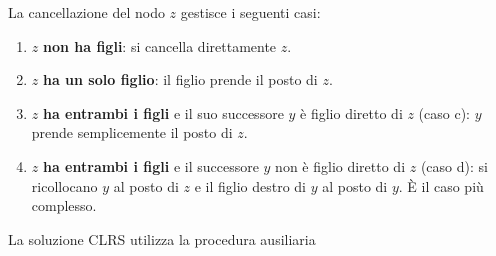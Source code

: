 La cancellazione del nodo $z$ gestisce i seguenti casi:
\begin{enumerate}
	\item $z$ \textbf{non ha figli}: si cancella direttamente $z$.
	\item $z$ \textbf{ha un solo figlio}: il figlio prende il posto di $z$.
	\item $z$ \textbf{ha entrambi i figli} e il suo successore $y$ è figlio diretto di
	$z$ (caso c): $y$ prende semplicemente il posto di $z$.
	\item $z$ \textbf{ha entrambi i figli} e il successore $y$ non è figlio diretto di
	$z$ (caso d): si ricollocano $y$ al posto di $z$ e il figlio destro di $y$
	al posto di $y$. È il caso più complesso.
\end{enumerate}

La soluzione CLRS utilizza la procedura ausiliaria

